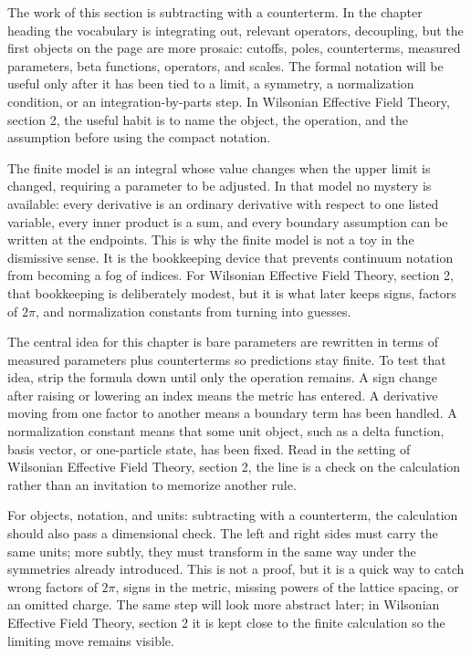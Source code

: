 The work of this section is subtracting with a counterterm.  In the chapter heading the vocabulary is integrating out, relevant operators, decoupling, but the first objects on the page are more prosaic: cutoffs, poles, counterterms, measured parameters, beta functions, operators, and scales.  The formal notation will be useful only after it has been tied to a limit, a symmetry, a normalization condition, or an integration-by-parts step.  In Wilsonian Effective Field Theory, section 2, the useful habit is to name the object, the operation, and the assumption before using the compact notation.

The finite model is an integral whose value changes when the upper limit is changed, requiring a parameter to be adjusted.  In that model no mystery is available: every derivative is an ordinary derivative with respect to one listed variable, every inner product is a sum, and every boundary assumption can be written at the endpoints.  This is why the finite model is not a toy in the dismissive sense.  It is the bookkeeping device that prevents continuum notation from becoming a fog of indices.  For Wilsonian Effective Field Theory, section 2, that bookkeeping is deliberately modest, but it is what later keeps signs, factors of \(2\pi\), and normalization constants from turning into guesses.

The central idea for this chapter is bare parameters are rewritten in terms of measured parameters plus counterterms so predictions stay finite.  To test that idea, strip the formula down until only the operation remains.  A sign change after raising or lowering an index means the metric has entered.  A derivative moving from one factor to another means a boundary term has been handled.  A normalization constant means that some unit object, such as a delta function, basis vector, or one-particle state, has been fixed.  Read in the setting of Wilsonian Effective Field Theory, section 2, the line is a check on the calculation rather than an invitation to memorize another rule.

For objects, notation, and units: subtracting with a counterterm, the calculation should also pass a dimensional check.  The left and right sides must carry the same units; more subtly, they must transform in the same way under the symmetries already introduced.  This is not a proof, but it is a quick way to catch wrong factors of \(2\pi\), signs in the metric, missing powers of the lattice spacing, or an omitted charge.  The same step will look more abstract later; in Wilsonian Effective Field Theory, section 2 it is kept close to the finite calculation so the limiting move remains visible.

